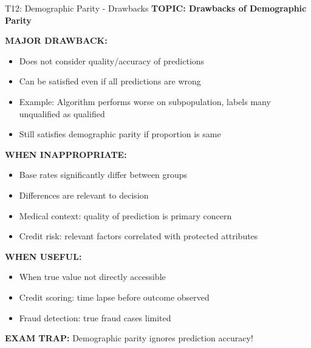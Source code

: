 \documentclass[8pt]{beamer}
\begin{document}
	\begin{frame}{T12: Demographic Parity - Drawbacks}
		\fontsize{6.5}{7.5}\selectfont
		\textbf{TOPIC: Drawbacks of Demographic Parity}
		
		\vspace{0.1cm}
		\textbf{MAJOR DRAWBACK:}
		\begin{itemize}
			\item Does not consider quality/accuracy of predictions
			\item Can be satisfied even if all predictions are wrong
			\item Example: Algorithm performs worse on subpopulation, labels many unqualified as qualified
			\item Still satisfies demographic parity if proportion is same
		\end{itemize}
		
		\vspace{0.1cm}
		\textbf{WHEN INAPPROPRIATE:}
		\begin{itemize}
			\item Base rates significantly differ between groups
			\item Differences are relevant to decision
			\item Medical context: quality of prediction is primary concern
			\item Credit risk: relevant factors correlated with protected attributes
		\end{itemize}
		
		\vspace{0.1cm}
		\textbf{WHEN USEFUL:}
		\begin{itemize}
			\item When true value not directly accessible
			\item Credit scoring: time lapse before outcome observed
			\item Fraud detection: true fraud cases limited
		\end{itemize}
		
		\textcolor{myred}{\textbf{EXAM TRAP:}} Demographic parity ignores \textcolor{myblue}{prediction accuracy}!
	\end{frame}
	
\end{document}
